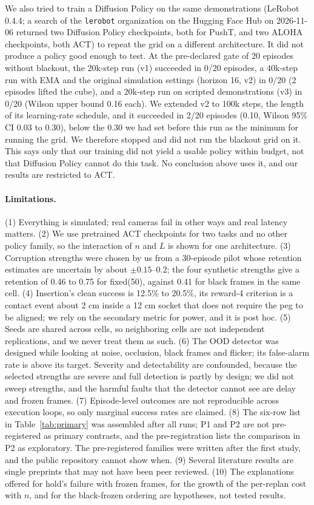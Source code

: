\documentclass[11pt]{article}
\newcommand{\fixed}{\textsf{fixed}\xspace}
\begin{document}
We also tried to train a Diffusion Policy on the same demonstrations (LeRobot 0.4.4; a search of the \texttt{lerobot} organization on the Hugging Face Hub on 2026-11-06 returned two Diffusion Policy checkpoints, both for PushT, and two ALOHA checkpoints, both ACT) to repeat the grid on a different architecture. It did not produce a policy good enough to test. At the pre-declared gate of 20 episodes without blackout, the 20k-step run (v1) succeeded in 0/20 episodes, a 40k-step run with EMA and the original simulation settings (horizon 16, v2) in 0/20 (2 episodes lifted the cube), and a 20k-step run on scripted demonstrations (v3) in 0/20 (Wilson upper bound 0.16 each). We extended v2 to 100k steps, the length of its learning-rate schedule, and it succeeded in 2/20 episodes (0.10, Wilson 95\% CI 0.03 to 0.30), below the 0.30 we had set before this run as the minimum for running the grid. We therefore stopped and did not run the blackout grid on it. This says only that our training did not yield a usable policy within budget, not that Diffusion Policy cannot do this task. No conclusion above uses it, and our results are restricted to ACT.

\paragraph{Limitations.} (1) Everything is simulated; real cameras fail in other ways and real latency matters. (2) We use pretrained ACT checkpoints for two tasks and no other policy family, so the interaction of $n$ and $L$ is shown for one architecture. (3) Corruption strengths were chosen by us from a 30-episode pilot whose retention estimates are uncertain by about $\pm0.15$--$0.2$; the four synthetic strengths give a retention of 0.46 to 0.75 for \fixed(50), against 0.41 for black frames in the same cell. (4) Insertion's clean success is 12.5\% to 20.5\%, its reward-4 criterion is a contact event about 2 cm inside a 12 cm socket that does not require the peg to be aligned; we rely on the secondary metric for power, and it is post hoc. (5) Seeds are shared across cells, so neighboring cells are not independent replications, and we never treat them as such. (6) The OOD detector was designed while looking at noise, occlusion, black frames and flicker; its false-alarm rate is above its target. Severity and detectability are confounded, because the selected strengths are severe and full detection is partly by design; we did not sweep strengths, and the harmful faults that the detector cannot see are delay and frozen frames. (7) Episode-level outcomes are not reproducible across execution loops, so only marginal success rates are claimed. (8) The six-row list in Table~\ref{tab:primary} was assembled after all runs; P1 and P2 are not pre-registered as primary contrasts, and the pre-registration lists the comparison in P2 as exploratory. The pre-registered families were written after the first study, and the public repository cannot show when. (9) Several literature results are single preprints that may not have been peer reviewed. (10) The explanations offered for hold's failure with frozen frames, for the growth of the per-replan cost with $n$, and for the black-frozen ordering are hypotheses, not tested results.
\end{document}
